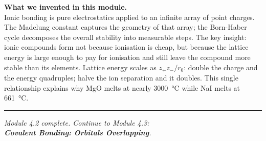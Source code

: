 \documentclass[12pt, a4paper]{book}
\begin{document}
\vspace{1.5em}
\begin{center}
\begin{tcolorbox}[enhanced, colback=DiscoveryColor!8, colframe=DiscoveryColor,
  width=0.88\textwidth, arc=3pt]
\centering\sffamily\small
\textbf{What we invented in this module.}\\[4pt]
Ionic bonding is pure electrostatics applied to an infinite
array of point charges.
The Madelung constant captures the geometry of that array;
the Born-Haber cycle decomposes the overall stability into
measurable steps.
The key insight: ionic compounds form not because ionisation
is cheap, but because the lattice energy is large enough
to pay for ionisation and still leave the compound more
stable than its elements.
Lattice energy scales as $z_+z_-/r_0$: double the charge
and the energy quadruples; halve the ion separation and
it doubles. This single relationship explains why MgO melts
at nearly \SI{3000}{\degreeCelsius} while NaI melts at
\SI{661}{\degreeCelsius}.
\end{tcolorbox}
\end{center}

\vspace{2em}
\noindent\textcolor{JourneyColor!40}{\rule{\textwidth}{0.6pt}}
\begin{center}\textit{\sffamily\small
Module 4.2 complete. Continue to Module 4.3:\\
\textbf{Covalent Bonding: Orbitals Overlapping}.}
\end{center}
\end{document}
